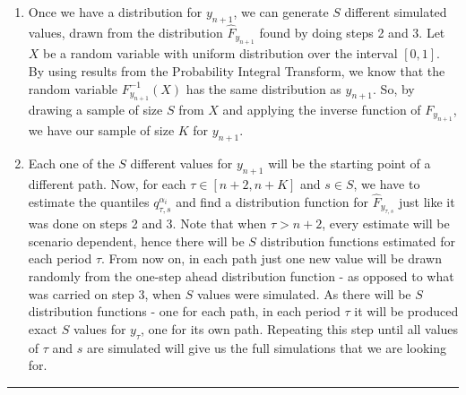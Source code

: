 \begin{enumerate}
\item Once we have a distribution for $y_{n+1}$, we can generate $S$ different simulated values, drawn from the distribution $\hat{F}_{y_{n+1}}$ found by doing steps 2 and 3. 
Let $X$ be a random variable with uniform distribution over the interval $[0,1]$. By using results from the Probability Integral Transform, we know that the random variable $F^{-1}_{y_{n+1}}(X)$ has the same distribution as $y_{n+1}$. So, by drawing a sample of size $S$ from $X$ and applying the inverse function of $F_{y_{n+1}}$, we have our sample of size $K$ for $y_{n+1}$.

\item Each one of the $S$ different values for $y_{n+1}$ will be the starting point of a different path. Now, for each $\tau \in [n+2,n+K]$ and $s \in S$, we have to estimate the quantiles $q_{\tau,s}^{\alpha_i}$ and find a distribution function for $\hat{F}_{y_{\tau,s}}$ just like it was done on steps 2 and 3.
Note that when $\tau > n+2$, every estimate will be scenario dependent, hence there will be $S$ distribution functions estimated for each period $\tau$. From now on, in each path just one new value will be drawn randomly from the one-step ahead distribution function - as opposed to what was carried on step 3, when $S$ values were simulated. As there will be $S$ distribution functions - one for each path, in each period $\tau$ it will be produced exact $S$ values for $y_\tau$, one for its own path. Repeating this step until all values of $\tau$ and $s$ are simulated will give us the full simulations that we are looking for.
\end{enumerate}


\noindent\rule{\textwidth}{1pt}